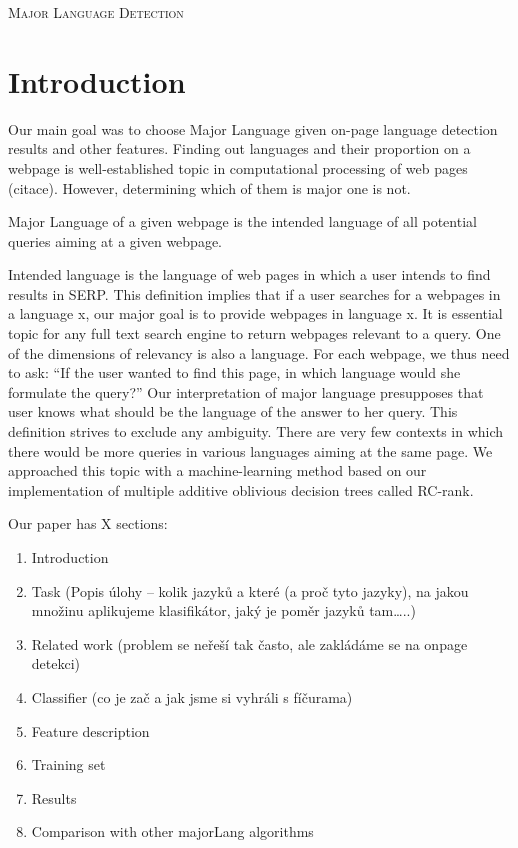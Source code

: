 \documentclass[12pt,a4paper]{article}     %
\begin{document}
  \begin{center}  
    \textsc{\Large Major Language Detection}
  \end{center}
  
  \section{Introduction}
  Our main goal was to choose Major Language given on-page language detection results and other features. Finding out languages and their proportion on a webpage is well-established topic in computational processing of web pages (citace). However, determining which of them is major one is not.

  Major Language of a given webpage is the intended language of all potential queries aiming at a given webpage. 

  Intended language is the language of web pages in which a user intends to find results in SERP. This definition implies that if a user searches for a webpages in a language x, our major goal is to provide webpages in language x.
  It is essential topic for any full text search engine to return webpages relevant to a query. One of the dimensions of relevancy is also a language. For each webpage, we thus need to ask: “If the user wanted to find this page, in which language would she formulate the query?” Our interpretation of major language presupposes that user knows what should be the language of the answer to her query.
  This definition strives to exclude any ambiguity. There are very few contexts in which there would be more queries in various languages aiming at the same page.
  We approached this topic with a machine-learning method based on our implementation of multiple additive oblivious decision trees called RC-rank.


  Our paper has X sections:
  \begin{enumerate}
  \item	Introduction
  \item Task (Popis úlohy – kolik jazyků a které (a proč tyto jazyky), na jakou množinu aplikujeme klasifikátor, jaký je poměr jazyků tam…..)

  \item Related work (problem se neřeší tak často, ale zakládáme se na onpage detekci)

  \item Classifier  (co je zač a jak jsme si vyhráli s fíčurama)
  \item Feature description
  \item Training set
  \item Results
  \item Comparison with other majorLang algorithms
  \end{enumerate}
\end{document}
